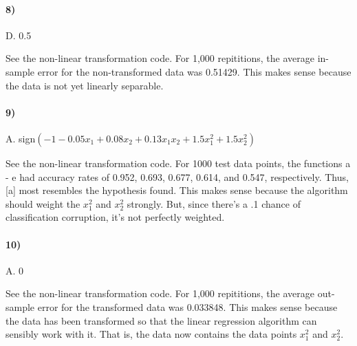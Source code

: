 \documentclass[10pt,letter]{article}
\begin{document}
\paragraph{8)} D. 0.5

	See the non-linear transformation code. For 1,000 repititions, the average in-sample error for the non-transformed data was 0.51429. This makes sense because the data is not yet linearly separable.

\paragraph{9)} A. sign$(-1 - 0.05x_1 + 0.08x_2 + 0.13x_1x_2 + 1.5x_1^2 + 1.5x_2^2)$

	See the non-linear transformation code. For 1000 test data points, the functions a - e had accuracy rates of 0.952, 0.693, 0.677, 0.614, and 0.547, respectively. Thus, [a] most resembles the hypothesis found. This makes sense because the algorithm should weight the $x_1^2$ and $x_2^2$ strongly. But, since there's a .1 chance of classification corruption, it's not perfectly weighted.

\paragraph{10)} A. 0

	See the non-linear transformation code. For 1,000 repititions, the average out-sample error for the transformed data was 0.033848. This makes sense because the data has been transformed so that the linear regression algorithm can sensibly work with it. That is, the data now contains the data points $x_1^2$ and $x_2^2$.
\end{document}

